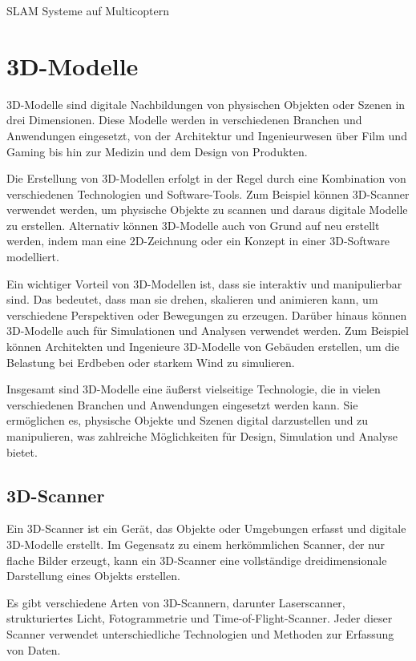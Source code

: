 \ac{SLAM} Systeme auf Multicoptern 

\section{3D-Modelle} \label{3d-modelle:section}
3D-Modelle sind digitale Nachbildungen von physischen Objekten oder Szenen in drei Dimensionen. Diese Modelle werden in verschiedenen Branchen und Anwendungen eingesetzt, von der Architektur und Ingenieurwesen über Film und Gaming bis hin zur Medizin und dem Design von Produkten.

Die Erstellung von 3D-Modellen erfolgt in der Regel durch eine Kombination von verschiedenen Technologien und Software-Tools. Zum Beispiel können 3D-Scanner verwendet werden, um physische Objekte zu scannen und daraus digitale Modelle zu erstellen. Alternativ können 3D-Modelle auch von Grund auf neu erstellt werden, indem man eine 2D-Zeichnung oder ein Konzept in einer 3D-Software modelliert.

Ein wichtiger Vorteil von 3D-Modellen ist, dass sie interaktiv und manipulierbar sind. Das bedeutet, dass man sie drehen, skalieren und animieren kann, um verschiedene Perspektiven oder Bewegungen zu erzeugen. Darüber hinaus können 3D-Modelle auch für Simulationen und Analysen verwendet werden. Zum Beispiel können Architekten und Ingenieure 3D-Modelle von Gebäuden erstellen, um die Belastung bei Erdbeben oder starkem Wind zu simulieren.

Insgesamt sind 3D-Modelle eine äußerst vielseitige Technologie, die in vielen verschiedenen Branchen und Anwendungen eingesetzt werden kann. Sie ermöglichen es, physische Objekte und Szenen digital darzustellen und zu manipulieren, was zahlreiche Möglichkeiten für Design, Simulation und Analyse bietet.

\subsection{3D-Scanner}
Ein 3D-Scanner ist ein Gerät, das Objekte oder Umgebungen erfasst und digitale 3D-Modelle erstellt. Im Gegensatz zu einem herkömmlichen Scanner, der nur flache Bilder erzeugt, kann ein 3D-Scanner eine vollständige dreidimensionale Darstellung eines Objekts erstellen.

Es gibt verschiedene Arten von 3D-Scannern, darunter Laserscanner, strukturiertes Licht, Fotogrammetrie und Time-of-Flight-Scanner. Jeder dieser Scanner verwendet unterschiedliche Technologien und Methoden zur Erfassung von Daten.

